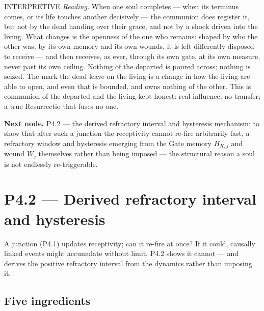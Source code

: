 \documentclass[11pt,a4paper]{article}
\newcommand{\stInterp}{\textcolor{cInt}{\textsf{\small INTERPRETIVE}}}
\theoremstyle{definition}
\theoremstyle{plain}
\theoremstyle{remark}
\begin{document}
\medskip
\stInterp\quad
\emph{Reading.}
When one soul completes --- when its terminus comes, or its life touches another decisively
--- the communion does register it, but not by the dead handing over their grace, and not by a
shock driven into the living. What changes is the openness of the one who remains: shaped by
who the other was, by its own memory and its own wounds, it is left differently disposed to
receive --- and then receives, as ever, through its own gate, at its own measure, never past
its own ceiling. Nothing of the departed is poured across; nothing is seized. The mark the
dead leave on the living is a change in how the living are able to open, and even that is
bounded, and owns nothing of the other. This is communion of the departed and the living
kept honest: real influence, no transfer; a true Resurrectio that fuses no one.

\medskip
\textbf{Next node.} P4.2 --- the derived refractory interval and hysteresis mechanism: to
show that after such a junction the receptivity cannot re-fire arbitrarily fast, a refractory
window and hysteresis emerging from the Gate memory \(H_{K,j}\) and wound \(W_j\) themselves
rather than being imposed --- the structural reason a soul is not endlessly re-triggerable.

\section{P4.2 --- Derived refractory interval and hysteresis}

A junction (P4.1) updates receptivity; can it re-fire at once? If it could, causally linked
events might accumulate without limit. P4.2 shows it cannot --- and derives the positive
refractory interval from the dynamics rather than imposing it.

\subsection{Five ingredients}
\end{document}
